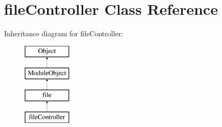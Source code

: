 \hypertarget{classfileController}{}\section{file\+Controller Class Reference}
\label{classfileController}
Inheritance diagram for file\+Controller\+:\begin{figure}[H]
\begin{center}
\leavevmode
\includegraphics[height=4.000000cm]{classfileController}
\end{center}
\end{figure}
